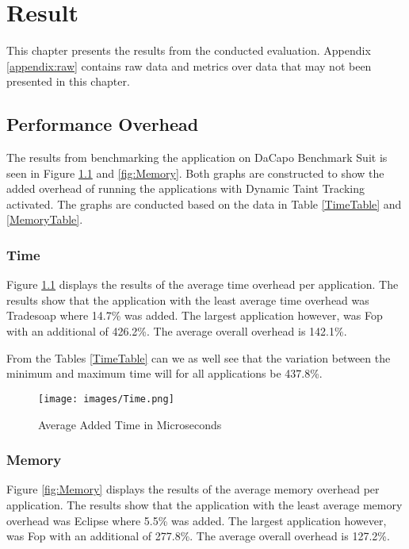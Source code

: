 \chapter{Result}
This chapter presents the results from the conducted evaluation. Appendix \ref{appendix:raw} contains raw data and metrics over data that may not been presented in this chapter.


\section{Performance Overhead}
The results from benchmarking the application on DaCapo Benchmark Suit \parencite{dacapo} is seen in Figure \ref{fig:Time} and \ref{fig:Memory}. Both graphs are constructed to show the added overhead of running the applications with Dynamic Taint Tracking activated. The graphs are conducted based on the data in Table \ref{TimeTable} and \ref{MemoryTable}.


\subsection{Time}
Figure \ref{fig:Time} displays the results of the average time overhead per application. The results show that the application with the least average time overhead was Tradesoap where 14.7\% was added. The largest application however, was Fop with an additional of 426.2\%. The average overall overhead is 142.1\%.

From the Tables \ref{TimeTable} can we as well see that the variation between the minimum and maximum time will for all applications be 437.8\%.

\begin{figure}[H]
	\centering
	\texttt{[image: images/Time.png]}
	\caption{Average Added Time in Microseconds}
	\label{fig:Time}
\end{figure}


\subsection{Memory}
Figure \ref{fig:Memory} displays the results of the average memory overhead per application. The results show that the application with the least average memory overhead was Eclipse where 5.5\% was added. The largest application however, was Fop with an additional of 277.8\%. The average overall overhead is 127.2\%.

